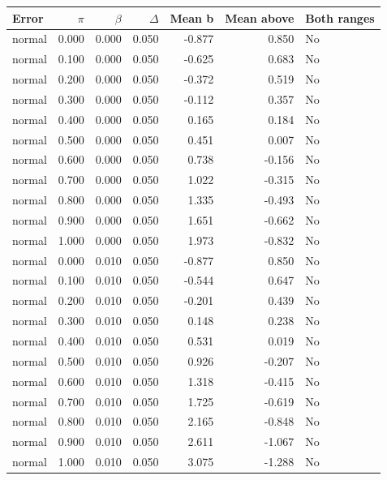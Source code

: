 \begin{tabular}{lrrrrrl}
\toprule
Error & $\pi$ & $\beta$ & $\Delta$ & Mean b & Mean above & Both ranges \\
\midrule
normal & 0.000 & 0.000 & 0.050 & -0.877 & 0.850 & No \\
normal & 0.100 & 0.000 & 0.050 & -0.625 & 0.683 & No \\
normal & 0.200 & 0.000 & 0.050 & -0.372 & 0.519 & No \\
normal & 0.300 & 0.000 & 0.050 & -0.112 & 0.357 & No \\
normal & 0.400 & 0.000 & 0.050 & 0.165 & 0.184 & No \\
normal & 0.500 & 0.000 & 0.050 & 0.451 & 0.007 & No \\
normal & 0.600 & 0.000 & 0.050 & 0.738 & -0.156 & No \\
normal & 0.700 & 0.000 & 0.050 & 1.022 & -0.315 & No \\
normal & 0.800 & 0.000 & 0.050 & 1.335 & -0.493 & No \\
normal & 0.900 & 0.000 & 0.050 & 1.651 & -0.662 & No \\
normal & 1.000 & 0.000 & 0.050 & 1.973 & -0.832 & No \\
normal & 0.000 & 0.010 & 0.050 & -0.877 & 0.850 & No \\
normal & 0.100 & 0.010 & 0.050 & -0.544 & 0.647 & No \\
normal & 0.200 & 0.010 & 0.050 & -0.201 & 0.439 & No \\
normal & 0.300 & 0.010 & 0.050 & 0.148 & 0.238 & No \\
normal & 0.400 & 0.010 & 0.050 & 0.531 & 0.019 & No \\
normal & 0.500 & 0.010 & 0.050 & 0.926 & -0.207 & No \\
normal & 0.600 & 0.010 & 0.050 & 1.318 & -0.415 & No \\
normal & 0.700 & 0.010 & 0.050 & 1.725 & -0.619 & No \\
normal & 0.800 & 0.010 & 0.050 & 2.165 & -0.848 & No \\
normal & 0.900 & 0.010 & 0.050 & 2.611 & -1.067 & No \\
normal & 1.000 & 0.010 & 0.050 & 3.075 & -1.288 & No \\
\bottomrule
\end{tabular}
\par\medskip
